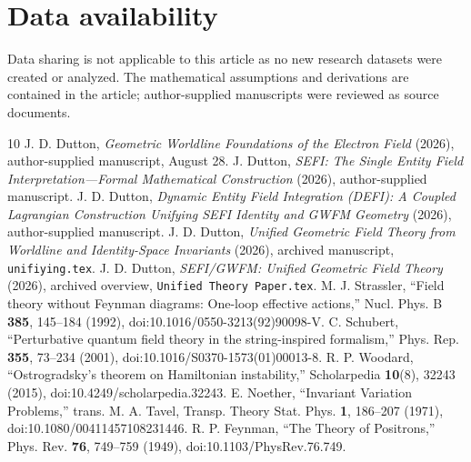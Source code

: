 \documentclass[aip,jmp,reprint,onecolumn,amsmath,amssymb]{revtex4-2}
\begin{document}
\section*{Data availability}
Data sharing is not applicable to this article as no new research datasets were created or analyzed. The mathematical assumptions and derivations are contained in the article; author-supplied manuscripts were reviewed as source documents.
\begin{thebibliography}{10}
 J. D. Dutton, \textit{Geometric Worldline Foundations of the Electron Field} (2026), author-supplied manuscript, August 28.
 J. Dutton, \textit{SEFI: The Single Entity Field Interpretation---Formal Mathematical Construction} (2026), author-supplied manuscript.
 J. D. Dutton, \textit{Dynamic Entity Field Integration (DEFI): A Coupled Lagrangian Construction Unifying SEFI Identity and GWFM Geometry} (2026), author-supplied manuscript.
 J. D. Dutton, \textit{Unified Geometric Field Theory from Worldline and Identity-Space Invariants} (2026), archived manuscript, \texttt{unifiying.tex}.
 J. D. Dutton, \textit{SEFI/GWFM: Unified Geometric Field Theory} (2026), archived overview, \texttt{Unified Theory Paper.tex}.
 M. J. Strassler, ``Field theory without Feynman diagrams: One-loop effective actions,'' Nucl. Phys. B \textbf{385}, 145--184 (1992), doi:10.1016/0550-3213(92)90098-V.
 C. Schubert, ``Perturbative quantum field theory in the string-inspired formalism,'' Phys. Rep. \textbf{355}, 73--234 (2001), doi:10.1016/S0370-1573(01)00013-8.
 R. P. Woodard, ``Ostrogradsky's theorem on Hamiltonian instability,'' Scholarpedia \textbf{10}(8), 32243 (2015), doi:10.4249/scholarpedia.32243.
 E. Noether, ``Invariant Variation Problems,'' trans. M. A. Tavel, Transp. Theory Stat. Phys. \textbf{1}, 186--207 (1971), doi:10.1080/00411457108231446.
 R. P. Feynman, ``The Theory of Positrons,'' Phys. Rev. \textbf{76}, 749--759 (1949), doi:10.1103/PhysRev.76.749.
\end{thebibliography}%
\end{document}
